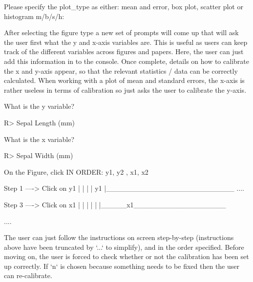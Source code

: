 \documentclass[article]{jss}
\begin{document}
\begin{CodeChunk}
\begin{CodeOutput}
Please specify the plot_type as either: mean and error, box plot,
 scatter plot or histogram m/b/s/h:
\end{CodeOutput}
\end{CodeChunk}

After selecting the figure type a new set of prompts will come up that will ask the user first what the y and x-axis variables are. This is useful as users can keep track of the different variables across figures and papers. Here, the user can just add this information in to the  console. Once complete, details on how to calibrate the x and y-axis appear, so that the relevant statistics / data can be correctly calculated. When working with a plot of mean and standard errors, the x-axis is rather useless in terms of calibration so  just asks the user to calibrate the y-axis. 

\begin{CodeChunk}
\begin{CodeOutput}
What is the y variable? 
\end{CodeOutput}
\begin{CodeInput}
R> Sepal Length (mm)
\end{CodeInput}

\begin{CodeOutput}
What is the x variable? 
\end{CodeOutput}
\begin{CodeInput}
R> Sepal Width (mm)
\end{CodeInput}

\begin{CodeOutput}
On the Figure, click IN ORDER: 
      y1, y2 , x1, x2  


    Step 1 ----> Click on y1
  |
  |
  |
  |
  y1
  |_________________________
  ....

    Step 3 ----> Click on x1
  |
  |
  |
  |
  |
  |_____x1__________________

  ....
\end{CodeOutput}
\end{CodeChunk}

The user can just follow the instructions on screen step-by-step (instructions above have been truncated by `...` to simplify), and in the order specified. Before moving on, the user is forced to check whether or not the calibration has been set up correctly. If `n` is chosen because something needs to be fixed then the user can re-calibrate.
\end{document}
